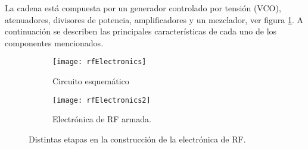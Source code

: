 La cadena está compuesta por un generador controlado por tensión (VCO), atenuadores, divisores de potencia, amplificadores y un mezclador, ver figura \ref{fig:rfElectronics}. A continuación se describen las principales características de cada uno de los componentes mencionados.

\begin{figure}[htb]
  \centering
  \begin{subfigure}{\textwidth}
    \centering
    \texttt{[image: rfElectronics]}
    \caption{Circuito esquemático}
  \end{subfigure}

  \begin{subfigure}{\textwidth}
    \centering
    \texttt{[image: rfElectronics2]}
    \caption{Electrónica de RF armada.}
  \end{subfigure}
  \caption{Distintas etapas en la construcción de la electrónica de RF.}
  \label{fig:rfElectronics}
\end{figure}

